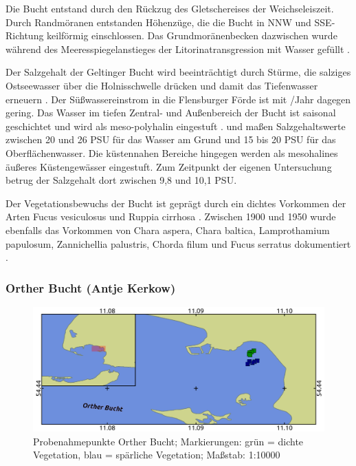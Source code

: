 Die Bucht entstand durch den Rückzug des Gletschereises der Weichseleiszeit. Durch Randmöranen entstanden Höhenzüge, die die Bucht in NNW und SSE-Richtung keilförmig einschlossen. Das Grundmoränenbecken dazwischen wurde während des Meeresspiegelanstieges der Litorinatransgression mit Wasser gefüllt \citep{reisch_1997}.

Der Salzgehalt der Geltinger Bucht wird beeinträchtigt durch Stürme, die salziges Ostseewasser über die Holnisschwelle drücken und damit das Tiefenwasser erneuern \citep{nikulina_2009}. Der Süßwassereinstrom  in die Flensburger Förde ist mit \unit{}{\kilo\cubic\metre}/Jahr \citep{lanu_2001} dagegen gering.
Das Wasser im tiefen Zentral- und Außenbereich der Bucht ist saisonal geschichtet und wird als meso-polyhalin eingestuft \citep{reimers_2005}. \cite{kandler_1963,exon_1972} und \cite{bluhm_1990} maßen Salzgehaltswerte zwischen 20 und 26 PSU für das Wasser am Grund und 15 bis 20 PSU für das Oberflächenwasser. Die küstennahen Bereiche hingegen werden als mesohalines äußeres Küstengewässer eingestuft. Zum Zeitpunkt der eigenen Untersuchung betrug der Salzgehalt dort zwischen 9,8 und 10,1 PSU.

Der Vegetationsbewuchs der Bucht ist geprägt durch ein dichtes Vorkommen der Arten Fucus vesiculosus und Ruppia cirrhosa . Zwischen 1900 und 1950 wurde ebenfalls das Vorkommen von Chara aspera, Chara baltica, Lamprothamium papulosum, Zannichellia palustris, Chorda filum und Fucus serratus dokumentiert \citep{mertens_2007}.


\subsubsection{Orther Bucht (Antje Kerkow)}

\begin{figure}[htb]
\centering
\includegraphics[width=1\textwidth]{images/OB.png}
\caption[Probenahmepunkte Orther Bucht]{Probenahmepunkte Orther Bucht; Markierungen: grün = dichte Vegetation, blau = spärliche Vegetation; Maßstab: 1:10000}
\label{OB}
\end{figure}



